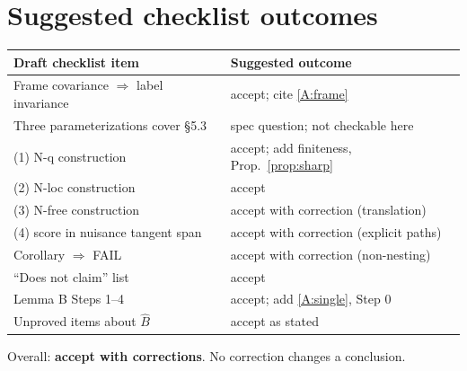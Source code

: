 \documentclass[11pt,a4paper]{article}
\theoremstyle{definition}
\theoremstyle{remark}
\begin{document}
\section{Suggested checklist outcomes}
\begin{center}
\begin{tabular}{@{}p{}p{}@{}}
\toprule
Draft checklist item & Suggested outcome\\
\midrule
Frame covariance $\Rightarrow$ label invariance & accept; cite \ref{A:frame}\\
Three parameterizations cover §5.3 & spec question; not checkable here\\
(1) N-q construction & accept; add finiteness, Prop.~\ref{prop:sharp}\\
(2) N-loc construction & accept\\
(3) N-free construction & accept with correction (translation)\\
(4) score in nuisance tangent span & accept with correction (explicit paths)\\
Corollary $\Rightarrow$ FAIL & accept with correction (non-nesting)\\
``Does not claim'' list & accept\\
Lemma B Steps 1--4 & accept; add \ref{A:single}, Step 0\\
Unproved items about $\hat B$ & accept as stated\\
\bottomrule
\end{tabular}
\end{center}
Overall: \textbf{accept with corrections}. No correction changes a conclusion.
\end{document}
